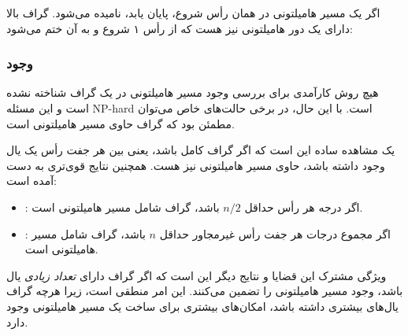 اگر یک مسیر هامیلتونی در همان رأس شروع، پایان یابد،
 نامیده می‌شود.
گراف بالا دارای یک دور هامیلتونی نیز هست
که از رأس ۱ شروع و به آن ختم می‌شود:
\begin{center}
\end{center}

\subsubsection{وجود}

هیچ روش کارآمدی برای بررسی وجود مسیر هامیلتونی در یک گراف
شناخته نشده است و این مسئله NP-hard است.
با این حال، در برخی حالت‌های خاص می‌توان مطمئن بود
که گراف حاوی مسیر هامیلتونی است.

یک مشاهده ساده این است که اگر گراف کامل باشد،
یعنی بین هر جفت رأس یک یال وجود داشته باشد،
حاوی مسیر هامیلتونی نیز هست.
همچنین نتایج قوی‌تری به دست آمده است:

\begin{itemize}
\item
{}
: %
اگر درجه هر رأس حداقل $n/2$ باشد،
گراف شامل مسیر هامیلتونی است.
\item
{}
: %
اگر مجموع درجات هر جفت رأس غیرمجاور
حداقل $n$ باشد،
گراف شامل مسیر هامیلتونی است.
\end{itemize}

ویژگی مشترک این قضایا و نتایج دیگر این است
که اگر گراف دارای \emph{تعداد زیادی} یال باشد،
وجود مسیر هامیلتونی را تضمین می‌کنند.
این امر منطقی است، زیرا هرچه گراف یال‌های بیشتری داشته باشد،
امکان‌های بیشتری برای ساخت یک مسیر هامیلتونی وجود دارد.

